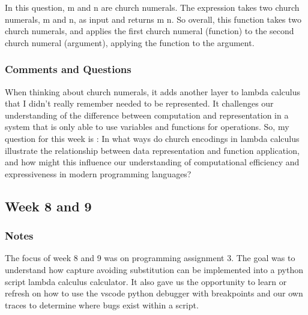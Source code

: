 \documentclass{article}
\theoremstyle{theorem}
\theoremstyle{definition}
\theoremstyle{remark}
\begin{document}
In this question, m and n are church numerals. The expression takes two church 
numerals, m and n, as input and returns m n. So overall, this function takes two church
numerals, and applies the first church numeral (function) to the second church numeral
(argument), applying the function to the argument.
\subsubsection*{Comments and Questions}
When thinking about church numerals, it adds another layer to lambda calculus that
I didn't really remember needed to be represented. It challenges our understanding of 
the difference between computation and representation in a system that is only able to 
use variables and functions for operations. So, my question for this week is :
In what ways do church encodings in lambda calculus illustrate the relationship between 
data representation and function application, and how might this influence our understanding
of computational efficiency and expressiveness in modern programming languages?
\subsection{Week 8 and 9}
\subsubsection*{Notes}
The focus of week 8 and 9 was on programming assignment 3. The goal was to understand 
how capture avoiding substitution can be implemented into a python script lambda calculus calculator.
It also gave us the opportunity to learn or refresh on how to use the vscode python debugger with 
breakpoints and our own traces to determine where bugs exist within a script.
\end{document}
